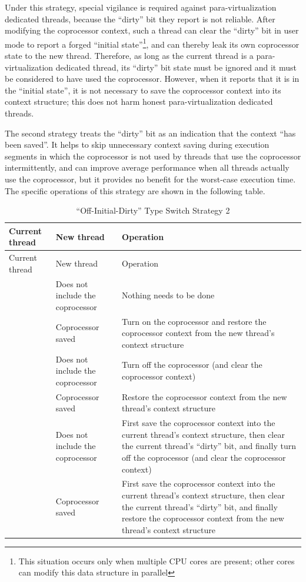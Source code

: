 Under this strategy, special vigilance is required against para-virtualization dedicated threads, because the ``dirty'' bit they report is not reliable. After modifying the coprocessor context, such a thread can clear the ``dirty'' bit in user mode to report a forged ``initial state''\footnote{This situation occurs only when multiple CPU cores are present; other cores can modify this data structure in parallel}, and can thereby leak its own coprocessor state to the new thread. Therefore, as long as the current thread is a para-virtualization dedicated thread, its ``dirty'' bit state must be ignored and it must be considered to have used the coprocessor. However, when it reports that it is in the ``initial state'', it is not necessary to save the coprocessor context into its context structure; this does not harm honest para-virtualization dedicated threads.

The second strategy treats the ``dirty'' bit as an indication that the context ``has been saved''. It helps to skip unnecessary context saving during execution segments in which the coprocessor is not used by threads that use the coprocessor intermittently, and can improve average performance when all threads actually use the coprocessor, but it provides no benefit for the worst-case execution time. The specific operations of this strategy are shown in the following table.

\begin{xltabular}{\textwidth}{@{}>{\hsize\raggedright\arraybackslash}X>{\hsize\raggedright\arraybackslash}X>{\hsize\raggedright\arraybackslash}X@{}}
\caption{``Off-Initial-Dirty'' Type Switch Strategy 2}\label{tab:9-4-off-initial-dirty-strategy-2}\\
\toprule
Current thread & New thread &
Operation\tabularnewline
\endfirsthead
\toprule
Current thread & New thread &
Operation\tabularnewline
\midrule
\endhead
\bottomrule
\endlastfoot
{} & Does not include the coprocessor\strut
 & Nothing needs to be done\strut
\tabularnewline
& Coprocessor saved &
Turn on the coprocessor and restore the coprocessor context from the new thread's context structure\tabularnewline
{} & Does not include the coprocessor\strut
 & Turn off the coprocessor (and clear the coprocessor context)\strut
\tabularnewline
& Coprocessor saved &
Restore the coprocessor context from the new thread's context structure\tabularnewline
{} & Does not include the coprocessor\strut
 & First save the coprocessor context into the current thread's context structure, then clear the current thread's ``dirty'' bit, and finally turn off the coprocessor (and clear the coprocessor context)\strut
\tabularnewline
& Coprocessor saved &
First save the coprocessor context into the current thread's context structure, then clear the current thread's ``dirty'' bit, and finally restore the coprocessor context from the new thread's context structure\tabularnewline
\end{xltabular}
\nopagebreak[4]

